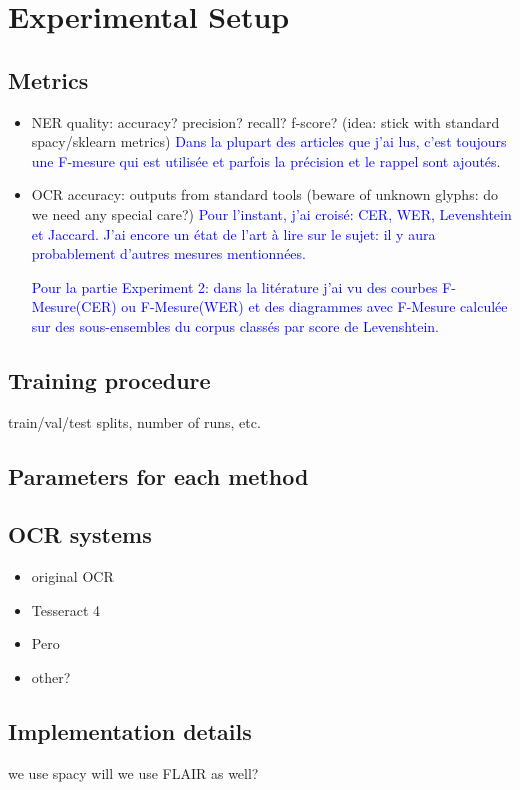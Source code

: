 \section{Experimental Setup}

\subsection{Metrics}
\begin{itemize}
    \item NER quality: accuracy? precision? recall? f-score? (idea: stick with standard spacy/sklearn metrics) \textcolor{blue}{Dans la plupart des articles que j'ai lus, c'est toujours une F-mesure qui est utilisée et parfois la précision et le rappel sont ajoutés.}
    \item OCR accuracy: outputs from standard tools (beware of unknown glyphs: do we need any special care?) \textcolor{blue}{Pour l'instant, j'ai croisé: CER, WER, Levenshtein et Jaccard. J'ai encore un état de l'art à lire sur le sujet: il y aura probablement d'autres mesures mentionnées.}
    
    \textcolor{blue}{Pour la partie Experiment 2: dans la litérature j'ai vu des courbes F-Mesure(CER) ou F-Mesure(WER) et des diagrammes avec F-Mesure calculée sur des sous-ensembles du corpus classés par score de Levenshtein.}
\end{itemize}

\subsection{Training procedure}
train/val/test splits, number of runs, etc.


\subsection{Parameters for each method}

\subsection{OCR systems}
\begin{itemize}
    \item original OCR
    \item Tesseract 4
    \item Pero
    \item other?
\end{itemize}

\subsection{Implementation details}
we use spacy 
will we use FLAIR as well?